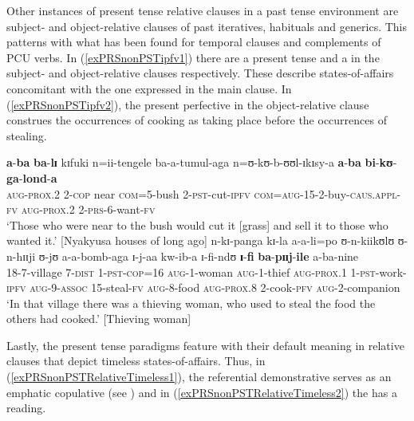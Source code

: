 Other instances of present tense relative clauses in a past tense environment are subject- and object-relative clauses of past iteratives, habituals and generics. This patterns with what has been found for temporal clauses and complements of PCU verbs. In (\ref{exPRSnonPSTipfv1}) there are a present tense  and a  in the subject- and object-relative clauses respectively. These describe states-of-affairs concomitant with the one expressed in the main clause. In (\ref{exPRSnonPSTipfv2}), the present perfective in the object-relative clause construes the occurrences of cooking as taking place before the occurrences of stealing.
\begin{exe}
\ex \label{exPRSnonPSTipfv1} \gll \textbf{a}-\textbf{ba} \textbf{ba}-\textbf{lɪ} kɪfuki n=ii-tengele ba-a-tumul-aga n=ʊ-kʊ-b-ʊʊl-ɪkɪsy-a \textbf{a}-\textbf{ba} \textbf{bi}-\textbf{kʊ}-\textbf{ga}-\textbf{lond}-\textbf{a}\\
\textsc{aug}-\textsc{prox.2} 2-\textsc{cop} near \textsc{com}=5-bush 2-\textsc{pst}-cut-\textsc{ipfv} \textsc{com}=\textsc{aug}-15-2-buy-\textsc{caus.appl}-\textsc{fv} \textsc{aug}-\textsc{prox.2} 2-\textsc{prs}-6-want-\textsc{fv}\\
\glt \lq Those who were near to the bush would cut it [grass] and sell it to those who wanted it.' [Nyakyusa houses of long ago]
\ex \label{exPRSnonPSTipfv2} \gll n-kɪ-panga kɪ-la a-a-li=po ʊ-n-kiikʊlʊ ʊ-n-hɪɪji ʊ-jʊ a-a-bomb-aga ɪ-j-aa kw-ib-a ɪ-fi-ndʊ \textbf{ɪ}-\textbf{fi} \textbf{ba}-\textbf{pɪɪj}-\textbf{ile} a-ba-nine\\
18-7-village 7-\textsc{dist} 1-\textsc{pst}-\textsc{cop}=16 \textsc{aug}-1-woman \textsc{aug}-1-thief \textsc{aug}-\textsc{prox.1} 1-\textsc{pst}-work-\textsc{ipfv} \textsc{aug}-9-\textsc{assoc} 15-steal-\textsc{fv} \textsc{aug}-8-food \textsc{aug}-\textsc{prox.8} 2-cook-\textsc{pfv} \textsc{aug}-2-companion\\
\glt \lq In that village there was a thieving woman, who used to steal the food the others had cooked.' [Thieving woman] %
\end{exe}

Lastly, the present tense paradigms feature with their default meaning in relative clauses that depict timeless states-of-affairs. Thus, in (\ref{exPRSnonPSTRelativeTimeless1}), the referential demonstrative serves as an emphatic copulative (see ) and in (\ref{exPRSnonPSTRelativeTimeless2}) the  has a  reading.

